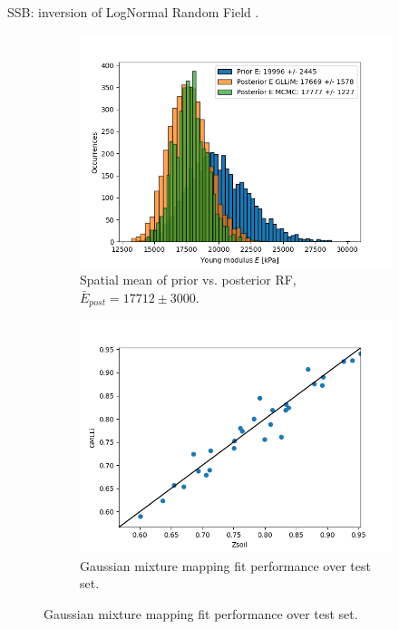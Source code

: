 	\begin{frame}{SSB: inversion of LogNormal Random Field .}
	\begin{figure}
	\begin{subfigure}{0.48\textwidth}
	\includegraphics[width=\textwidth]{graphs/rf_E/young_hist.png}
	\caption{Spatial mean of prior vs. posterior RF, $\bar{E}_{post} = 17712 \pm 3000$.}
	\end{subfigure}
	\begin{subfigure}{0.48\textwidth}
	\includegraphics[width=\textwidth]{graphs/rf_E/gllim_test.png}
	\caption{Gaussian mixture mapping fit performance over test set.}
	\end{subfigure}
	\end{figure}
	\end{frame}
	
